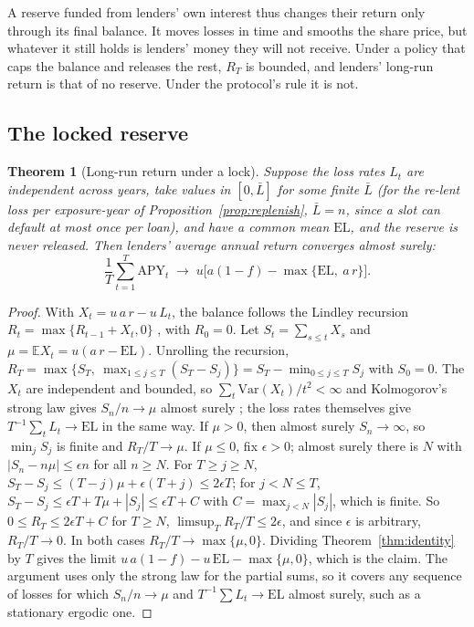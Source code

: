 \documentclass[11pt]{article}
\theoremstyle{plain}
\newtheorem{theorem}{Theorem}
\theoremstyle{definition}
\newcommand{\E}{\mathbb{E}}
\newcommand{\EL}{\mathrm{EL}}
\begin{document}
A reserve funded from lenders' own interest thus changes their return only through its final balance.
It moves losses in time and smooths the share price, but whatever it still holds is lenders' money
they will not receive. Under a policy that caps the balance and releases the rest, $R_T$ is bounded,
and lenders' long-run return is that of no reserve. Under the protocol's rule it is not.

\subsection{The locked reserve}

\begin{theorem}[Long-run return under a lock]\label{thm:longrun}
Suppose the loss rates $L_t$ are independent across years, take values in $[0,\bar L]$ for some
finite $\bar L$ (for the re-lent loss per exposure-year of Proposition~\ref{prop:replenish},
$\bar L=n$, since a slot can default at most once per loan), and have a common mean $\EL$, and the
reserve is never released. Then lenders' average annual return converges almost surely:
\[
  \frac{1}{T}\sum_{t=1}^T\mathrm{APY}_t\;\longrightarrow\;u\bigl[a(1-f)-\max\{\EL,\ a\,r\}\bigr].
\]
\end{theorem}

\begin{proof}
With $X_t=u\,a\,r-u\,L_t$, the balance follows the Lindley recursion $R_t=\max\{R_{t-1}+X_t,0\}$
\citep{lindley1952}, with $R_0=0$. Let $S_t=\sum_{s\le t}X_s$ and $\mu=\E X_t=u(a\,r-\EL)$. Unrolling the
recursion, $R_T=\max\{S_T,\ \max_{1\le j\le T}(S_T-S_j)\}=S_T-\min_{0\le j\le T}S_j$ with $S_0=0$. The
$X_t$ are independent and bounded, so $\sum_t\mathrm{Var}(X_t)/t^2<\infty$ and Kolmogorov's strong law gives
$S_n/n\to\mu$ almost surely \citep[Theorem~22.7]{billingsley1995}; the loss rates themselves give
$T^{-1}\sum_tL_t\to\EL$ in the same way. If $\mu>0$, then almost surely $S_n\to\infty$, so $\min_jS_j$
is finite and $R_T/T\to\mu$. If $\mu\le0$, fix $\epsilon>0$; almost surely there is $N$ with
$|S_n-n\mu|\le\epsilon n$ for all $n\ge N$. For $T\ge j\ge N$,
$S_T-S_j\le(T-j)\mu+\epsilon(T+j)\le2\epsilon T$; for $j<N\le T$, $S_T-S_j\le\epsilon T+T\mu+|S_j|\le
\epsilon T+C$ with $C=\max_{j<N}|S_j|$, which is finite. So $0\le R_T\le2\epsilon T+C$ for $T\ge N$,
$\limsup_T R_T/T\le2\epsilon$, and since $\epsilon$ is arbitrary, $R_T/T\to0$. In both cases
$R_T/T\to\max\{\mu,0\}$.
Dividing Theorem~\ref{thm:identity} by $T$ gives the limit $u\,a(1-f)-u\,\EL-\max\{\mu,0\}$, which is the
claim. The argument uses only the strong law for the partial sums, so it covers any sequence of losses
for which $S_n/n\to\mu$ and $T^{-1}\sum L_t\to\EL$ almost surely, such as a stationary ergodic one.
\end{proof}
\end{document}
